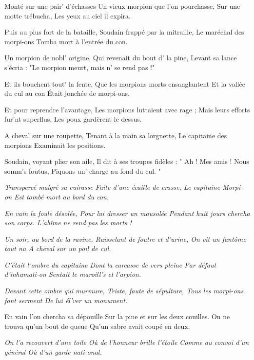 \beginverse
Monté sur une pair' d'échasses
Un vieux morpion que l'on pourchasse,
Sur une motte trébucha,
Les yeux au ciel il expira.
\endverse

\beginverse
Puis au plus fort de la bataille,
Soudain frappé par la mitraille,
Le maréchal des morpi-ons
Tomba mort à l'entrée du con.
\endverse

\beginverse
Un morpion de nobl' origine,
Qui revenait du bout d' la pine,
Levant sa lance s'écria :
"Le morpion meurt, mais n' se rend pas !"
\endverse

\beginverse
Et ils bouchent tout' la fente,
Que les morpions morts ensanglantent
Et la vallée du cul au con
Était jonchée de morpi-ons.
\endverse

\beginverse
Et pour reprendre l'avantage,
Les morpions luttaient avec rage ;
Mais leurs efforts fur'nt superflus,
Les poux gardèrent le dessus.
\endverse

\beginverse
A cheval sur une roupette,
Tenant à la main sa lorgnette,
Le capitaine des morpions
Examinait les positions.
\endverse

\beginverse
Soudain, voyant plier son aile,
Il dit à ses troupes fidèles :
" Ah ! Mes amis ! Nous somm's foutus,
Piquons un' charge au fond du cul. "
\endverse

\beginverse
\textit {Transpercé malgré sa cuirasse
Faite d'une écaille de crasse,
Le capitaine Morpi-on
Est tombé mort au bord du con.}
\endverse

\beginverse
\textit {En vain la foule désolée,
Pour lui dresser un mausolée
Pendant huit jours chercha son corps.
L'abîme ne rend pas les morts !}
\endverse

\beginverse
\textit {Un soir, au bord de la ravine,
Ruisselant de foutre et d'urine,
On vit un fantôme tout nu
A cheval sur un poil de cul.}
\endverse

\beginverse
\textit {C'était l'ombre du capitaine
Dont la carcasse de vers pleine
Par défaut d'inhumati-on
Sentait le maroill's et l'arpion.}
\endverse

\beginverse
\textit {Devant cette ombre qui murmure,
Triste, faute de sépulture,
Tous les morpi-ons font serment
De lui él'ver un monument.}
\endverse

\beginverse
En vain l'on chercha sa dépouille
Sur la pine et sur les deux couilles.
On ne trouva qu'un bout de queue
Qu'un sabre avait coupé en deux.
\endverse

\beginverse
\textit {On l'a recouvert d'une toile
Où de l'honneur brille l'étoile
Comme au convoi d'un général
Où d'un garde nati-onal.}
\endverse

